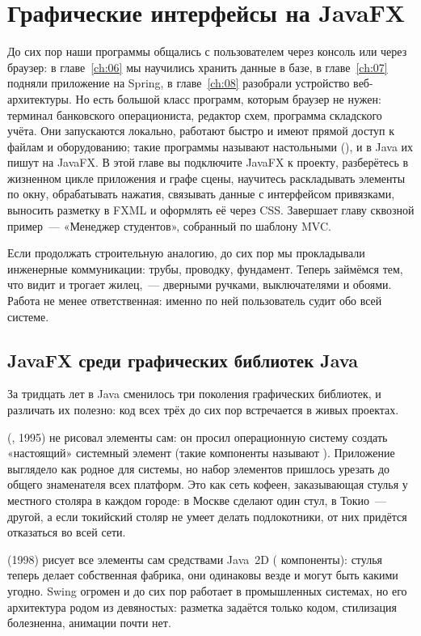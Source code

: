 \chapter{Графические интерфейсы на JavaFX}
\label{ch:09}

До сих пор наши программы общались с пользователем через консоль или через
браузер: в главе~\ref{ch:06} мы научились хранить данные в базе, в
главе~\ref{ch:07} подняли приложение на Spring, в главе~\ref{ch:08} разобрали
устройство веб-архитектуры. Но есть большой класс программ, которым браузер не
нужен: терминал банковского операциониста, редактор схем, программа складского
учёта. Они запускаются локально, работают быстро и имеют прямой доступ к файлам
и оборудованию; такие программы называют настольными (), и в Java
их пишут на JavaFX. В этой главе вы подключите JavaFX к проекту, разберётесь в
жизненном цикле приложения и графе сцены, научитесь раскладывать элементы по
окну, обрабатывать нажатия, связывать данные с интерфейсом привязками, выносить
разметку в FXML и оформлять её через CSS. Завершает главу сквозной пример~---
«Менеджер студентов», собранный по шаблону MVC.

Если продолжать строительную аналогию, до сих пор мы прокладывали инженерные
коммуникации: трубы, проводку, фундамент. Теперь займёмся тем, что видит и
трогает жилец,~--- дверными ручками, выключателями и обоями. Работа не менее
ответственная: именно по ней пользователь судит обо всей системе.

\section{JavaFX среди графических библиотек Java}

За тридцать лет в Java сменилось три поколения графических библиотек, и
различать их полезно: код всех трёх до сих пор встречается в живых проектах.

 (, 1995) не рисовал элементы сам: он
просил операционную систему создать «настоящий» системный элемент (такие
компоненты называют ). Приложение выглядело как родное для
системы, но набор элементов пришлось урезать до общего знаменателя всех
платформ. Это как сеть кофеен, заказывающая стулья у местного столяра в каждом
городе: в Москве сделают один стул, в Токио~--- другой, а если токийский столяр
не умеет делать подлокотники, от них придётся отказаться во всей сети.

 (1998) рисует все элементы сам средствами Java~2D
( компоненты): стулья теперь делает собственная фабрика, они
одинаковы везде и могут быть какими угодно. Swing огромен и до сих пор работает
в промышленных системах, но его архитектура родом из девяностых: разметка
задаётся только кодом, стилизация болезненна, анимации почти нет.

